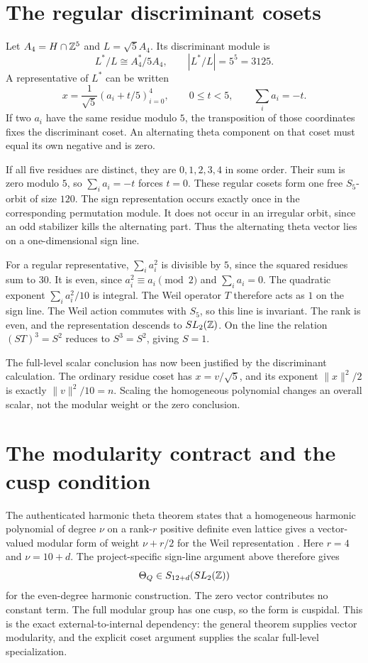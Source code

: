\section{The regular discriminant cosets}
Let $A_4=H\cap\mathbb Z^5$ and $L=\sqrt5 A_4$. Its discriminant module is
\[
L^*/L\cong A_4^*/5A_4,
\qquad |L^*/L|=5^5=3125.
\]
A representative of $L^*$ can be written
\[
x=\frac1{\sqrt5}(a_i+t/5)_{i=0}^4,
\qquad0\le t<5,\qquad\sum_i a_i=-t.
\]
If two $a_i$ have the same residue modulo $5$, the transposition of those coordinates fixes the discriminant coset. An alternating theta component on that coset must equal its own negative and is zero.

If all five residues are distinct, they are $0,1,2,3,4$ in some order. Their sum is zero modulo $5$, so $\sum_i a_i=-t$ forces $t=0$. These regular cosets form one free $S_5$-orbit of size $120$. The sign representation occurs exactly once in the corresponding permutation module. It does not occur in an irregular orbit, since an odd stabilizer kills the alternating part. Thus the alternating theta vector lies on a one-dimensional sign line.

For a regular representative, $\sum_i a_i^2$ is divisible by $5$, since the squared residues sum to $30$. It is even, since $a_i^2\equiv a_i\pmod2$ and $\sum_i a_i=0$. The quadratic exponent $\sum_i a_i^2/10$ is integral. The Weil operator $T$ therefore acts as $1$ on the sign line. The Weil action commutes with $S_5$, so this line is invariant. The rank is even, and the representation descends to $SL_2(\mathbb Z)$. On the line the relation $(ST)^3=S^2$ reduces to $S^3=S^2$, giving $S=1$.

The full-level scalar conclusion has now been justified by the discriminant calculation. The ordinary residue coset has $x=v/\sqrt5$, and its exponent $\|x\|^2/2$ is exactly $\|v\|^2/10=n$. Scaling the homogeneous polynomial changes an overall scalar, not the modular weight or the zero conclusion.

\section{The modularity contract and the cusp condition}
The authenticated harmonic theta theorem states that a homogeneous harmonic polynomial of degree $\nu$ on a rank-$r$ positive definite even lattice gives a vector-valued modular form of weight $\nu+r/2$ for the Weil representation \cite{IW}. Here $r=4$ and $\nu=10+d$. The project-specific sign-line argument above therefore gives
\begin{equation}\label{eq:thetalevelone}
\Theta_Q\in S_{12+d}(SL_2(\mathbb Z))
\end{equation}
for the even-degree harmonic construction. The zero vector contributes no constant term. The full modular group has one cusp, so the form is cuspidal. This is the exact external-to-internal dependency: the general theorem supplies vector modularity, and the explicit coset argument supplies the scalar full-level specialization.

